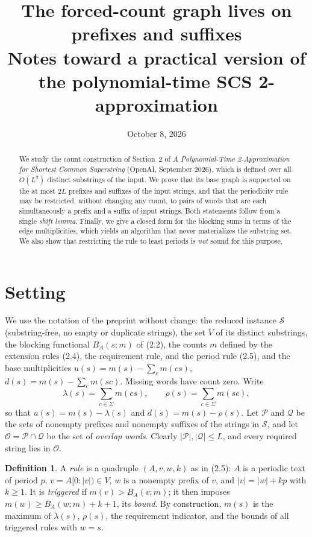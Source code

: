 \documentclass[11pt]{article}
\title{The forced-count graph lives on prefixes and suffixes\\[2pt]
\large Notes toward a practical version of the polynomial-time SCS 2-approximation}
\date{October 8, 2026}
\author{}
\numberwithin{equation}{section}
\theoremstyle{definition}
\newtheorem{definition}[theorem]{Definition}
\newcommand{\len}[1]{\lvert #1\rvert}
\newcommand{\Pre}{\mathcal P}
\newcommand{\Suf}{\mathcal Q}
\newcommand{\Ov}{\mathcal O}
\begin{document}
\maketitle

\begin{abstract}
We study the count construction of Section~2 of \emph{A Polynomial-Time
2-Approximation for Shortest Common Superstring} (OpenAI, September 2026),
which is defined over all $O(L^2)$ distinct substrings of the input. We prove
that its base graph is supported on the at most $2L$ prefixes and suffixes of
the input strings, and that the periodicity rule may be restricted, without
changing any count, to pairs of words that are each simultaneously a prefix and a suffix of
input strings. Both statements follow from a single \emph{shift lemma}. Finally,
we give a closed form for the blocking sums in terms of the edge multiplicities,
which yields an algorithm that never materializes the substring set. We also
show that restricting the rule to least periods is \emph{not} sound for this
purpose.
\end{abstract}

\section{Setting}

We use the notation of the preprint without change: the reduced instance
$\mathcal S$ (substring-free, no empty or duplicate strings), the set $V$ of
its distinct substrings, the blocking functional $B_A(s;m)$ of (2.2), the
counts $m$ defined by the extension rules (2.4), the requirement rule, and
the period rule (2.5), and the base multiplicities
$u(s)=m(s)-\sum_c m(cs)$, $d(s)=m(s)-\sum_c m(sc)$. Missing words have count
zero. Write
\[
\lambda(s)=\sum_{c\in\Sigma}m(cs),\qquad \rho(s)=\sum_{c\in\Sigma}m(sc),
\]
so that $u(s)=m(s)-\lambda(s)$ and $d(s)=m(s)-\rho(s)$. Let $\Pre$ and $\Suf$
be the sets of nonempty prefixes and nonempty suffixes of the strings in
$\mathcal S$, and let $\Ov=\Pre\cap\Suf$ be the set of \emph{overlap words}.
Clearly $\len\Pre,\len\Suf\le L$, and every required string lies in $\Ov$.

\begin{definition}
A \emph{rule} is a quadruple $(A,v,w,k)$ as in (2.5): $A$ is a periodic text
of period $p$, $v=A[0:\len v)\in V$, $w$ is a nonempty prefix of $v$, and
$\len v=\len w+kp$ with $k\ge1$. It is \emph{triggered} if
$m(v)>B_A(v;m)$; it then imposes $m(w)\ge B_A(w;m)+k+1$, its \emph{bound}.
By construction, $m(s)$ is the maximum of $\lambda(s)$, $\rho(s)$, the
requirement indicator, and the bounds of all triggered rules with $w=s$.
\end{definition}
\end{document}

